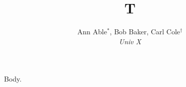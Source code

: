 \documentclass{article}
\title{T}
\author{Ann Able$^\ast$,\footremember{c}{Corresponding author.} Bob Baker, Carl Cole$^\dag$\\ {\em Univ X}}
\begin{document}
\maketitle Body.
\end{document}
